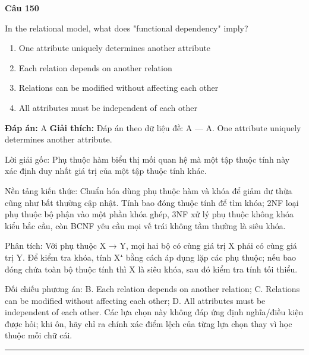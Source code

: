 \documentclass[11pt,a4paper]{article}
\newenvironment{question}[1]{%
  \par\vspace{1em}\noindent\textbf{\large Câu #1}\par\vspace{0.4em}
}{%
  \par\vspace{1em}\hrule\vspace{0.6em}
}
\newenvironment{choices}{%
  \begin{enumerate}[label=\textbf{\Alph*.},leftmargin=2.2em,itemsep=2pt,topsep=3pt]
}{%
  \end{enumerate}
}
\newcommand{\choice}{\item}
\begin{document}
\begin{question}{150}
In the relational model, what does "functional dependency" imply?
\begin{choices}
\choice One attribute uniquely determines another attribute
\choice Each relation depends on another relation
\choice Relations can be modified without affecting each other
\choice All attributes must be independent of each other
\end{choices}
\textbf{Đáp án:} A
\textbf{Giải thích:} Đáp án theo dữ liệu đề: A — A. One attribute uniquely determines another attribute.

Lời giải gốc: Phụ thuộc hàm biểu thị mối quan hệ mà một tập thuộc tính này xác định duy nhất giá trị của một tập thuộc tính khác.

Nền tảng kiến thức: Chuẩn hóa dùng phụ thuộc hàm và khóa để giảm dư thừa cũng như bất thường cập nhật. Tính bao đóng thuộc tính để tìm khóa; 2NF loại phụ thuộc bộ phận vào một phần khóa ghép, 3NF xử lý phụ thuộc không khóa kiểu bắc cầu, còn BCNF yêu cầu mọi vế trái không tầm thường là siêu khóa.

Phân tích: Với phụ thuộc X → Y, mọi hai bộ có cùng giá trị X phải có cùng giá trị Y. Để kiểm tra khóa, tính X⁺ bằng cách áp dụng lặp các phụ thuộc; nếu bao đóng chứa toàn bộ thuộc tính thì X là siêu khóa, sau đó kiểm tra tính tối thiểu.

Đối chiếu phương án: B. Each relation depends on another relation; C. Relations can be modified without affecting each other; D. All attributes must be independent of each other. Các lựa chọn này không đáp ứng định nghĩa/điều kiện được hỏi; khi ôn, hãy chỉ ra chính xác điểm lệch của từng lựa chọn thay vì học thuộc mỗi chữ cái.
\end{question}
\end{document}
